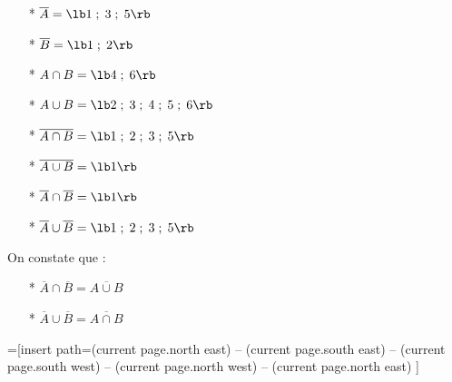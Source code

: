 \begin{itemize}
\item[*] $ \overline{A} = \lb 1\; ; \; 3 \; ; \; 5\rb $ \\
\item[*] $ \overline{B} = \lb 1 \; ; \; 2 \rb $ \\
\item[*] $ A \cap B = \lb 4 \; ; \; 6 \rb $ \\
\item[*] $ A \cup B = \lb 2 \; ; \; 3 \; ; \; 4 \; ; \; 5 \; ; \; 6 \rb $ \\
\item[*] $ \overline{A \cap B} = \lb 1 \; ; \; 2 \; ; \;  3 \; ; \; 5 \rb $ \\
\item[*] $\overline{A \cup B} = \lb 1 \rb $ \\
\item[*] $ \overline{A} \cap \overline{B} = \lb 1 \rb $ \\
\item[*] $ \overline{A} \cup \overline{B} = \lb 1 \; ; \; 2 \; ; \; 3 \; ; \; 5 \rb $ \\
\end{itemize}

On constate que : 

\begin{itemize}
\item[*] $ \overline{A} \cap \overline{B} = \overline{A \cup B} $ \\
\item[*] $ \overline{A} \cup \overline{B} = \overline{A \cap B} $ \\
\end{itemize}


=[insert path={(current page.north east) --
  (current page.south east) --
  (current page.south west) --
  (current page.north west) --
  (current page.north east)}
]

\def\A_rond{(0,-.5)  circle  (1 and 2.5)}
\def\B_rond{(1,1)  circle  (1 and 2)}
\def\GrandRond{(2:0) circle (3.5 and 4)}

